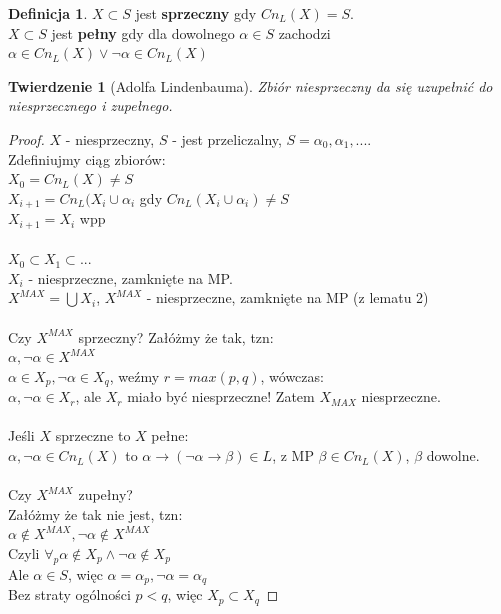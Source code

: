\documentclass[10pt,a4paper]{article}
\theoremstyle{plain}
\newtheorem{theorem}{Twierdzenie}
\theoremstyle{definition}
\newtheorem*{definition}{Definicja}
\begin{document}
\begin{definition}
$X \subset S$ jest \textbf{sprzeczny} gdy $Cn_L(X) = S$.\\
$X \subset S$ jest \textbf{pełny} gdy dla dowolnego $\alpha \in S$ zachodzi 
$\alpha \in Cn_L(X) \vee \neg \alpha \in Cn_L(X)$
\end{definition}

\begin{theorem}[Adolfa Lindenbauma]
Zbiór niesprzeczny da się uzupełnić do niesprzecznego i zupełnego.
\end{theorem}
\begin{proof}
$X$ - niesprzeczny, $S$ - jest przeliczalny, $S = {\alpha_0, \alpha_1, ...}$.\\
Zdefiniujmy ciąg zbiorów:\\
$X_0 = Cn_L(X) \neq S$\\
$X_{i+1} = Cn_L(X_i \cup {\alpha_i}$ gdy $Cn_L(X_i \cup {\alpha_i}) \neq S$\\
$X_{i+1} = X_i$ wpp \\ \\
$X_0 \subset X_1 \subset ...$ \\
$X_i$ - niesprzeczne, zamknięte na MP.\\
$X^{MAX} = \bigcup X_i$, $X^{MAX}$ - niesprzeczne, zamknięte na MP (z lematu 2)
\\ \\
Czy $X^{MAX}$ sprzeczny? Załóżmy że tak, tzn:\\
$\alpha, \neg \alpha \in X^{MAX}$\\
$\alpha \in X_p, \neg \alpha \in X_q$, weźmy $r = max(p, q)$, wówczas:\\
 $\alpha, \neg \alpha \in X_r$, ale $X_r$ miało być niesprzeczne! 
 Zatem $X_{MAX}$ niesprzeczne.\\ \\
Jeśli $X$ sprzeczne to $X$ pełne:\\
$\alpha, \neg \alpha \in Cn_L(X)$ to 
$\alpha \rightarrow (\neg \alpha \rightarrow \beta) \in L$, 
z MP $\beta \in Cn_L(X)$, $\beta$ dowolne. 
\\ \\
Czy $X^{MAX}$ zupełny?\\
Załóżmy że tak nie jest, tzn:\\
$\alpha \not \in X^{MAX}, \neg \alpha \not \in X^{MAX}$\\
Czyli $\forall_p \alpha \not \in X_p \wedge \neg \alpha \not \in X_p$\\
Ale $\alpha \in S$, więc $\alpha = \alpha_p, \neg \alpha = \alpha_q$\\
Bez straty ogólności $p < q$, więc $X_p \subset X_q$


\end{proof}
\end{document}
